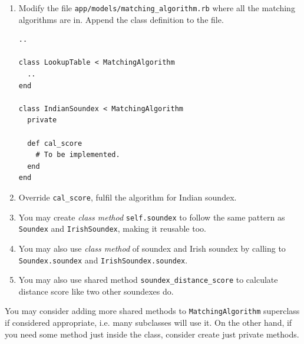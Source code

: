 \begin{enumerate}
  \item Modify the file \texttt{app/models/matching\_algorithm.rb} where all
    the matching algorithms are in. Append the class definition to the file.

    \begin{minipage}{\linewidth}
    \begin{lstlisting}
..

class LookupTable < MatchingAlgorithm
  ..
end

class IndianSoundex < MatchingAlgorithm
  private

  def cal_score
    # To be implemented.
  end
end
    \end{lstlisting}
    \end{minipage}

  \item Override \texttt{cal\_score}, fulfil the algorithm for Indian
    soundex.
  \item You may create \emph{class method} \texttt{self.soundex} to follow
    the same pattern as \texttt{Soundex} and \texttt{IrishSoundex}, making
    it reusable too.
  \item You may also use \emph{class method} of soundex and Irish soundex
    by calling to \texttt{Soundex.soundex} and \texttt{IrishSoundex.soundex}.
  \item You may also use shared method \texttt{soundex\_distance\_score}
    to calculate distance score like two other soundexes do.
\end{enumerate}

You may consider adding more shared methods to \texttt{MatchingAlgorithm}
superclass if considered appropriate, i.e. many subclasses will use it.
On the other hand, if you need some method just inside the class,
consider create just private methods.

